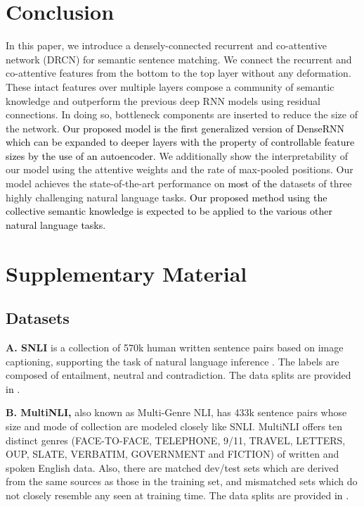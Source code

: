 \documentclass[letterpaper]{article} \usepackage{aaai19}  \usepackage{times}  \usepackage{helvet}  \usepackage{courier}  \usepackage{url}  \usepackage{graphicx}  \frenchspacing  \setlength{\pdfpagewidth}{8.5in}  \setlength{\pdfpageheight}{11in}
\newcommand\sh[1]{\textcolor{black}{#1}}
\newcommand\shh[1]{\textcolor{black}{#1}}
\newcommand\nj[1]{\textcolor{black}{#1}}
\begin{document}
\section{Conclusion}
\label{sec:conclusion}
In this paper, we introduce a densely-connected recurrent and co-attentive network (DRCN) for semantic sentence matching. We connect the recurrent and co-attentive features from the bottom to the top layer without any deformation. These intact features over multiple layers compose a community of semantic knowledge and outperform the previous deep RNN models using residual connections. In doing so, bottleneck components are inserted to reduce the size of the network. 
\sh{Our proposed model is the first generalized version of DenseRNN which can be expanded to deeper layers with the property of controllable feature sizes by the use of an autoencoder.}
We additionally show the interpretability of our model using the attentive weights and the rate of max-pooled positions. Our model achieves the state-of-the-art performance on 
\shh{most of the}
datasets of three highly challenging natural language tasks. 
\shh{Our proposed method using the collective semantic knowledge is expected to be applied to the various other natural language tasks.}



\small




\section{Supplementary Material}

\subsection{Datasets}

\noindent \textbf{A. SNLI} is a collection of 570k human written sentence pairs based on image captioning, supporting the task of natural language inference \cite{snliemnlp2015}. The labels are composed of entailment, neutral and contradiction. The data splits are provided \nj{in} \cite{snliemnlp2015}. 



\noindent \textbf{B. MultiNLI,} also known as Multi-Genre NLI, has 433k sentence pairs whose size and mode of collection are modeled closely like SNLI. MultiNLI offers ten distinct genres (FACE-TO-FACE, TELEPHONE, 9/11, TRAVEL, LETTERS, OUP, SLATE, VERBATIM, GOVERNMENT and FICTION) of written and spoken English data. Also, there are matched dev/test sets which are derived from the same sources as those in the training set, and mismatched sets which do not closely resemble any seen at training time. The data splits are provided \nj{in} \cite{williams2017broad}.
\end{document}
